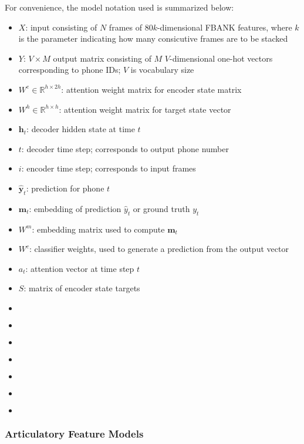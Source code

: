For convenience, the model notation used is summarized below:
\begin{itemize}
    \item $X $: input consisting of $N$ frames of $80k$-dimensional FBANK features, where $k$ is the parameter indicating how many consicutive frames are to be stacked \\
    \item $Y $: $V \times M $ output matrix consisting of $M$ $V$-dimensional one-hot vectors corresponding to phone IDs; $V$ is vocabulary size \\
    \item $W^e \in \mathbb{R}^{h \times 2h}$: attention weight matrix for encoder state matrix
    \item $W^h \in \mathbb{R}^{h \times h}$: attention weight matrix for target state vector 
    \item $\textbf{h}_t $: decoder hidden state at time $t$
    \item $t $: decoder time step; corresponds to output phone number
    \item $i $: encoder time step; corresponds to input frames 
    \item $\hat{\textbf{y}}_t$: prediction for phone $t$
    \item $\textbf{m}_t $: embedding of prediction $\hat{y}_t$ or ground truth $y_t$
    \item $W^m$: embedding matrix used to compute $\textbf{m}_t$
    \item $W^c $: classifier weights, used to generate a prediction from the output vector
    \item $a_t $: attention vector at time step $t$ 
    \item $S$: matrix of encoder state targets 
    \item $ $ 
    \item $ $ 
    \item $ $ 
    \item $ $ 
    \item $ $ 
    \item $ $ 
    \item $ $ 
    
\end{itemize}



\subsubsection{Articulatory Feature Models}

